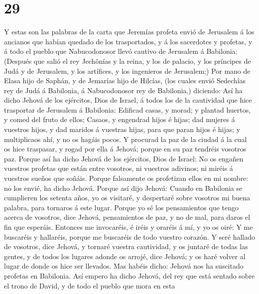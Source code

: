 \hypertarget{section-28}{%
\section{29}\label{section-28}}

 Y estas son las palabras de la carta que Jeremías profeta
envió de Jerusalem á los ancianos que habían quedado de los
trasportados, y á los sacerdotes y profetas, y á todo el pueblo que
Nabucodonosor llevó cautivo de Jerusalem á Babilonia: 
(Después que salió el rey Jechônías y la reina, y los de palacio, y los
príncipes de Judá y de Jerusalem, y los artífices, y los ingenieros de
Jerusalem;)  Por mano de Elasa hijo de Saphán, y de Jemarías
hijo de Hilcías, (los cuales envió Sedechîas rey de Judá á Babilonia, á
Nabucodonosor rey de Babilonia,) diciendo:  Así ha dicho
Jehová de los ejércitos, Dios de Israel, á todos los de la cautividad
que hice trasportar de Jerusalem á Babilonia:  Edificad
casas, y morad; y plantad huertos, y comed del fruto de ellos;
 Casaos, y engendrad hijos é hijas; dad mujeres á vuestros
hijos, y dad maridos á vuestras hijas, para que paran hijos é hijas; y
multiplicaos ahí, y no os hagáis pocos.  Y procurad la paz
de la ciudad á la cual os hice traspasar, y rogad por ella á Jehová;
porque en su paz tendréis vosotros paz.  Porque así ha dicho
Jehová de los ejércitos, Dios de Israel: No os engañen vuestros profetas
que están entre vosotros, ni vuestros adivinos; ni miréis á vuestros
sueños que soñáis.  Porque falsamente os profetizan ellos en
mi nombre: no los envié, ha dicho Jehová.  Porque así dijo
Jehová: Cuando en Babilonia se cumplieren los setenta años, yo os
visitaré, y despertaré sobre vosotros mi buena palabra, para tornaros á
este lugar.  Porque yo sé los pensamientos que tengo acerca
de vosotros, dice Jehová, pensamientos de paz, y no de mal, para daros
el fin que esperáis.  Entonces me invocaréis, é iréis y
oraréis á mí, y yo os oiré:  Y me buscaréis y hallaréis,
porque me buscaréis de todo vuestro corazón.  Y seré
hallado de vosotros, dice Jehová, y tornaré vuestra cautividad, y os
juntaré de todas las gentes, y de todos los lugares adonde os arrojé,
dice Jehová; y os haré volver al lugar de donde os hice ser llevados.
 Mas habéis dicho: Jehová nos ha suscitado profetas en
Babilonia.  Así empero ha dicho Jehová, del rey que está
sentado sobre el trono de David, y de todo el pueblo que mora en esta
